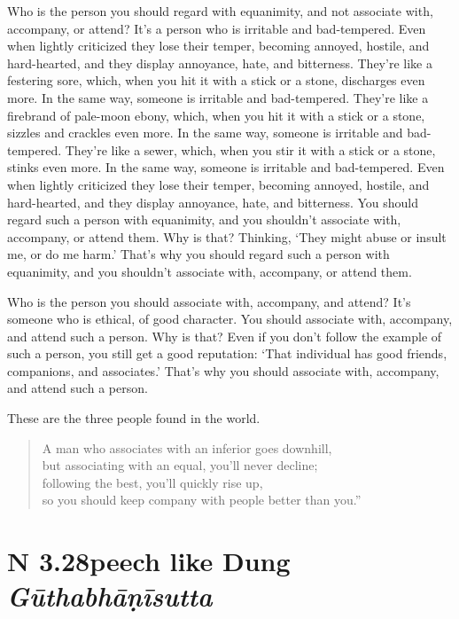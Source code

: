 \documentclass[12pt,openany]{book}%
\newcommand*{\suttatitleacronym}[1]{\smaller[2]{#1}\vspace*{.3em}}
\newcommand*{\suttatitletranslation}[1]{\linebreak{#1}}
\newcommand*{\suttatitleroot}[1]{\linebreak\smaller[2]\itshape{#1}}
\newcommand*{\tocacronym}[1]{\hspace*{-3.3em}{#1}\quad}
\newcommand*{\toctranslation}[1]{#1}
\newcommand*{\tocroot}[1]{(\textit{#1})}
\begin{document}
Who is the person you should regard with equanimity, and not associate with, accompany, or attend? It’s a person who is irritable and bad-tempered. Even when lightly criticized they lose their temper, becoming annoyed, hostile, and hard-hearted, and they display annoyance, hate, and bitterness. They’re like a festering sore, which, when you hit it with a stick or a stone, discharges even more. In the same way, someone is irritable and bad-tempered. They’re like a firebrand of pale-moon ebony, which, when you hit it with a stick or a stone, sizzles and crackles even more. In the same way, someone is irritable and bad-tempered. They’re like a sewer, which, when you stir it with a stick or a stone, stinks even more. In the same way, someone is irritable and bad-tempered. Even when lightly criticized they lose their temper, becoming annoyed, hostile, and hard-hearted, and they display annoyance, hate, and bitterness. You should regard such a person with equanimity, and you shouldn’t associate with, accompany, or attend them. Why is that? Thinking, ‘They might abuse or insult me, or do me harm.’ That’s why you should regard such a person with equanimity, and you shouldn’t associate with, accompany, or attend them. 

Who is the person you should associate with, accompany, and attend? It’s someone who is ethical, of good character. You should associate with, accompany, and attend such a person. Why is that? Even if you don’t follow the example of such a person, you still get a good reputation: ‘That individual has good friends, companions, and associates.’ That’s why you should associate with, accompany, and attend such a person. 

These are the three people found in the world. 

\begin{verse}%
A man who associates with an inferior goes downhill, \\
but associating with an equal, you’ll never decline; \\
following the best, you’ll quickly rise up, \\
so you should keep company with people better than you.” 

%
\end{verse}

%
\section*{{\suttatitleacronym AN 3.28}{\suttatitletranslation Speech like Dung }{\suttatitleroot Gūthabhāṇīsutta}}
\addcontentsline{toc}{section}{\tocacronym{AN 3.28} \toctranslation{Speech like Dung } \tocroot{Gūthabhāṇīsutta}}
\end{document}
